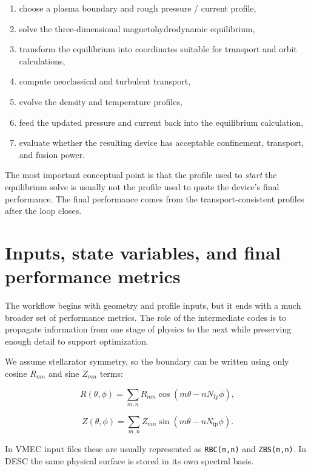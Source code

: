 \documentclass[11pt]{article}
\begin{document}
\begin{enumerate}
  \item choose a plasma boundary and rough pressure / current profile,
  \item solve the three-dimensional magnetohydrodynamic equilibrium,
  \item transform the equilibrium into coordinates suitable for transport and orbit calculations,
  \item compute neoclassical and turbulent transport,
  \item evolve the density and temperature profiles,
  \item feed the updated pressure and current back into the equilibrium calculation,
  \item evaluate whether the resulting device has acceptable confinement, transport, and fusion power.
\end{enumerate}

The most important conceptual point is that the profile used to \emph{start}
the equilibrium solve is usually not the profile used to quote the device's
final performance. The final performance comes from the transport-consistent
profiles after the loop closes.

\section{Inputs, state variables, and final performance metrics}

The workflow begins with geometry and profile inputs, but it ends with a much
broader set of performance metrics. The role of the intermediate codes is to
propagate information from one stage of physics to the next while preserving
enough detail to support optimization.

We assume stellarator symmetry, so the boundary can be written using only
cosine $R_{mn}$ and sine $Z_{mn}$ terms:

\begin{equation}
R(\theta,\phi) = \sum_{m,n} R_{mn}\cos\!\left(m\theta - nN_{\mathrm{fp}}\phi\right),
\end{equation}

\begin{equation}
Z(\theta,\phi) = \sum_{m,n} Z_{mn}\sin\!\left(m\theta - nN_{\mathrm{fp}}\phi\right).
\end{equation}

In VMEC input files these are usually represented as \texttt{RBC(m,n)} and
\texttt{ZBS(m,n)}. In DESC the same physical surface is stored in its own
spectral basis.
\end{document}
